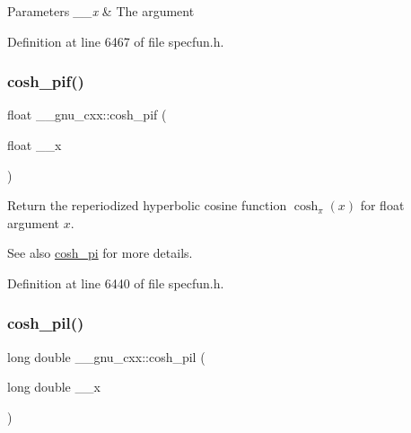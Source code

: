 \begin{DoxyParams}{Parameters}
{\em \+\_\+\+\_\+x} & The argument \\
\hline
\end{DoxyParams}


Definition at line 6467 of file specfun.\+h.

\mbox{\label{group__gnu__math__spec__func_ga79a2f5c9da96b5ea6c663d6efca24944}} 
\subsubsection{\texorpdfstring{cosh\+\_\+pif()}{cosh\_pif()}}
{\footnotesize\ttfamily float \+\_\+\+\_\+gnu\+\_\+cxx\+::cosh\+\_\+pif (\begin{DoxyParamCaption}\item[{float}]{\+\_\+\+\_\+x }\end{DoxyParamCaption})\hspace{0.3cm}{\ttfamily [inline]}}

Return the reperiodized hyperbolic cosine function $ \cosh_\pi(x) $ for {\ttfamily float} argument $ x $.

\begin{DoxySeeAlso}{See also}
\hyperlink{group__gnu__math__spec__func_gaf59c68a01adfdab0f22c4fb405ab2a36}{cosh\+\_\+pi} for more details. 
\end{DoxySeeAlso}


Definition at line 6440 of file specfun.\+h.

\mbox{\label{group__gnu__math__spec__func_gab7bf4f591dd35af2bdb88a8219f5e248}} 
\subsubsection{\texorpdfstring{cosh\+\_\+pil()}{cosh\_pil()}}
{\footnotesize\ttfamily long double \+\_\+\+\_\+gnu\+\_\+cxx\+::cosh\+\_\+pil (\begin{DoxyParamCaption}\item[{long double}]{\+\_\+\+\_\+x }\end{DoxyParamCaption})\hspace{0.3cm}{\ttfamily [inline]}}

